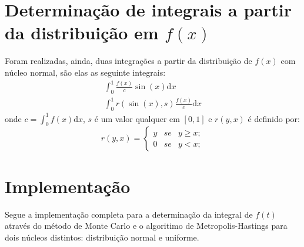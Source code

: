 \documentclass [a4paper,10pt]{article}
\begin{document}
	\section{Determinação de integrais a partir da distribuição em $f(x)$}
	  Foram realizadas, ainda, duas integrações a partir da distribuição de $f(x)$ com núcleo normal,
	  são elas as seguinte integrais:
	  \begin{eqnarray}
	    \int_0^1 \frac{f(x)}{c}\sin(x)\mathrm{d}x\\
	    \int_0^1 r(\sin(x), s)\frac{f(x)}{c}\mathrm{d}x
	  \end{eqnarray}
	  onde $c = \int_0^1 f(x)\mathrm{d}x$, $s$ é um valor qualquer em $[0, 1]$ e $r(y, x)$ é definido por:
	  \[
	  	r(y, x) = \left \{\begin{array}{lcr}
	  						y & se & y \ge x;\\
	  						0 & se & y < x;
	  					\end{array}\right.
	  \]
		  
	\section{Implementação}
		Segue a implementação completa para a determinação da integral de $f(t)$ através do método de Monte Carlo e
		o algoritimo de Metropolis-Hastings para dois núcleos distintos: distribuição normal e uniforme.
    	{\linespread{1.15}
    	}
		
\end{document}
